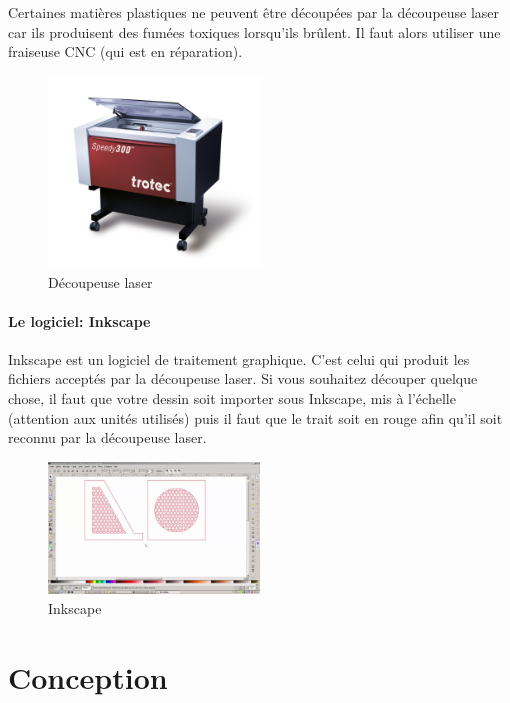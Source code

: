 \documentclass[a4paper, 11pt]{report}
\begin{document}
Certaines matières plastiques ne peuvent être découpées par la découpeuse laser car ils produisent des fumées toxiques lorsqu'ils brûlent. Il faut alors utiliser une fraiseuse CNC (qui est en réparation).

\begin{figure}[h!]
	\begin{center}
		\includegraphics[width=0.5\textwidth]{images/decoupeuse_laser.jpg}
		\caption{Découpeuse laser}
	\end{center}
\end{figure}

\subsection{Le logiciel: Inkscape}
Inkscape est un logiciel de traitement graphique. C'est celui qui produit les fichiers acceptés par la découpeuse laser. Si vous souhaitez découper quelque chose, il faut que votre dessin soit importer sous Inkscape, mis à l'échelle (attention aux unités utilisés) puis il faut que le trait soit en rouge afin qu'il soit reconnu par la découpeuse laser.

\begin{figure}[h!]
	\begin{center}
		\includegraphics[width=0.5\textwidth]{images/inkscape.jpg}
		\caption{Inkscape}
	\end{center}
\end{figure}

\part{Conception}
\end{document}
